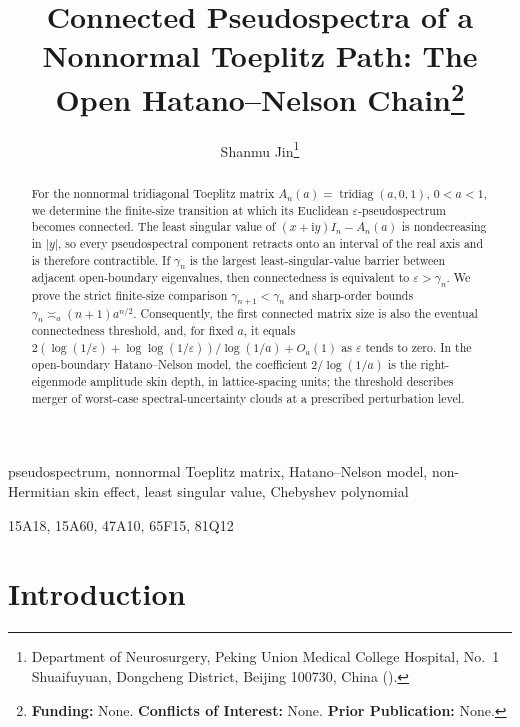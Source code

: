 \documentclass[review,hidelinks,onefignum,onetabnum]{siamart251216}
\title{Connected Pseudospectra of a Nonnormal Toeplitz Path:
The Open Hatano--Nelson Chain\thanks{{\bfseries Funding:} None.
{\bfseries Conflicts of Interest:} None.
{\bfseries Prior Publication:} None.}}
\author{Shanmu Jin\thanks{Department of Neurosurgery, Peking Union Medical
College Hospital, No.~1 Shuaifuyuan, Dongcheng District, Beijing 100730,
China (\email{jinshanmu1129@pku.edu.cn}).}}
\DeclareMathOperator{\tridiag}{tridiag}
\newcommand{\ii}{\mathrm i}
\begin{document}
\maketitle

\begin{abstract}
For the nonnormal tridiagonal Toeplitz matrix
$A_n(a)=\tridiag(a,0,1)$, $0<a<1$, we determine the finite-size
transition at which its Euclidean $\varepsilon$-pseudospectrum becomes
connected.  The least singular value of $(x+\ii y)I_n-A_n(a)$ is
nondecreasing in $|y|$, so every pseudospectral component retracts onto
an interval of the real axis and is therefore contractible.  If
$\gamma_n$ is the largest least-singular-value barrier between adjacent
open-boundary eigenvalues, then connectedness is equivalent to
$\varepsilon>\gamma_n$.  We prove the strict finite-size comparison
$\gamma_{n+1}<\gamma_n$ and sharp-order bounds
$\gamma_n\asymp_a(n+1)a^{n/2}$.  Consequently, the first connected
matrix size is also the eventual connectedness threshold, and, for fixed
$a$, it equals $2(\log(1/\varepsilon)+\log\!\log(1/\varepsilon))/
\log(1/a)+O_a(1)$ as $\varepsilon$ tends to zero.  In the open-boundary
Hatano--Nelson model, the coefficient $2/\log(1/a)$ is the right-eigenmode
amplitude skin depth, in lattice-spacing units; the threshold describes
merger of worst-case spectral-uncertainty clouds at a prescribed
perturbation level.
\end{abstract}

\begin{keywords}
pseudospectrum, nonnormal Toeplitz matrix, Hatano--Nelson model,
non-Hermitian skin effect, least singular value, Chebyshev polynomial
\end{keywords}

\begin{MSCcodes}
15A18, 15A60, 47A10, 65F15, 81Q12
\end{MSCcodes}

\section{Introduction}\label{sec:introduction}
\end{document}
